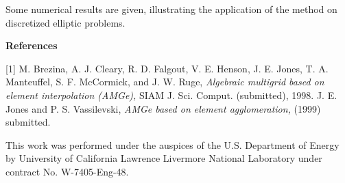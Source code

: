 \documentclass{article}
\begin{document}
Some numerical results are given, illustrating the application of the
method on discretized elliptic problems.


{\bf 
References
}

[1] M. Brezina, A. J. Cleary, R. D. Falgout, V. E. Henson, J. E. Jones, T.
A. Manteuffel, S. F. McCormick, and J. W. Ruge,
{\em 
Algebraic multigrid
based on element interpolation (AMGe),
}
SIAM J. Sci. Comput. (submitted),
1998. \newline
[2] J. E. Jones and P. S. Vassilevski,
{\em 
AMGe based on element agglomeration,
}
(1999) submitted.

This work was performed under the auspices of the U.S. Department of Energy
by University of California Lawrence Livermore National Laboratory under
contract No. W-7405-Eng-48.
\end{document}

